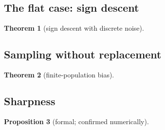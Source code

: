 \documentclass[10pt]{article}
\newtheorem{theorem}{Theorem}
\newtheorem{proposition}[theorem]{Proposition}
\theoremstyle{definition}
\theoremstyle{remark}
\begin{document}
\subsection{The flat case: sign descent}
\begin{theorem}[sign descent with discrete noise]\label{thm:sign}\StmtSign\end{theorem}


\subsection{Sampling without replacement}
\begin{theorem}[finite-population bias]\label{thm:wor}\StmtWor\end{theorem}


\subsection{Sharpness}
\begin{proposition}[formal; confirmed numerically]\label{prop:lattice2}\StmtLattice\end{proposition}






\end{document}

